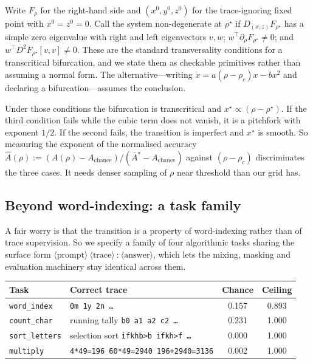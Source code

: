 \documentclass{article}
\theoremstyle{plain}
\theoremstyle{definition}
\theoremstyle{remark}
\newcommand{\1}{\mathbf{1}}
\begin{document}
Write $F_\rho$ for the right-hand side and $(x^0,y^0,z^0)$ for the trace-ignoring
fixed point with $x^0 = z^0 = 0$. Call the system non-degenerate at $\rho^\star$
if $D_{(x,z)}F_{\rho^\star}$ has a simple zero eigenvalue with right and left
eigenvectors $v,w$; $w^\top\partial_\rho F_{\rho^\star}\ne0$; and
$w^\top D^2F_{\rho^\star}[v,v]\ne0$. These are the standard transversality
conditions for a transcritical bifurcation, and we state them as checkable
primitives rather than assuming a normal form. The alternative---writing
$\dot x = a(\rho-\rho_c)x-bx^2$ and declaring a bifurcation---assumes the
conclusion.

Under those conditions the bifurcation is transcritical and
$x^\star\propto(\rho-\rho^\star)$. If the third condition fails while the cubic
term does not vanish, it is a pitchfork with exponent $1/2$. If the second fails,
the transition is imperfect and $x^\star$ is smooth. So measuring the exponent of
the normalised accuracy
$\widehat A(\rho) :=
(A(\rho)-A_{\mathrm{chance}})/(\bar A^\star-A_{\mathrm{chance}})$ against
$(\rho-\rho_c)$ discriminates the three cases. It needs denser sampling of $\rho$
near threshold than our grid has.

\subsection{Beyond word-indexing: a task family}
\label{app:family}

A fair worry is that the transition is a property of word-indexing rather than of
trace supervision. So we specify a family of four algorithmic tasks sharing the
surface form $\langle\text{prompt}\rangle\ \langle\text{trace}\rangle\
\texttt{:}\ \langle\text{answer}\rangle$, which lets the mixing, masking and
evaluation machinery stay identical across them.

\begin{center}
\small
\begin{tabular}{llcc}
\toprule
Task & Correct trace & Chance & Ceiling \\
\midrule
\texttt{word\_index} & \texttt{0m 1y 2n \dots} & 0.157 & 0.893 \\
\texttt{count\_char} & running tally \texttt{b0 a1 a2 c2 \dots} & 0.231 & 1.000 \\
\texttt{sort\_letters} & selection sort \texttt{ifkhb>b ifkh>f \dots} & 0.000 & 1.000 \\
\texttt{multiply} & \texttt{4*49=196 60*49=2940 196+2940=3136} & 0.002 & 1.000 \\
\bottomrule
\end{tabular}
\end{center}
\end{document}
